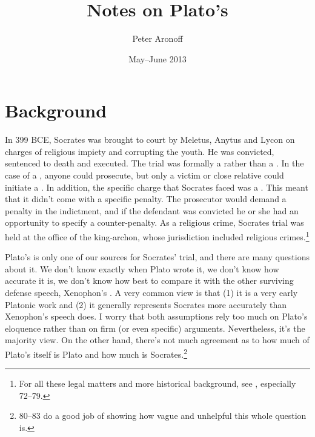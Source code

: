 \documentclass[11pt]{article}
\begin{document}
\begin{titlepage}
\title{Notes on Plato's }
\author{Peter Aronoff}
\date{May--June 2013}
\maketitle
\end{titlepage}

\section{Background}

In 399 BCE, Socrates was brought to court by Meletus, Anytus and Lycon on charges of religious impiety and corrupting the youth.  He was convicted, sentenced to death and executed.  The trial was formally a  rather than a .  In the case of a , anyone could prosecute, but only a victim or close relative could initiate a .  In addition, the specific charge that Socrates faced was a .  This meant that it didn't come with a specific penalty.  The prosecutor would demand a penalty in the indictment, and if the defendant was convicted he or she had an opportunity to specify a counter-penalty.  As a religious crime, Socrates trial was held at the office of the king-archon, whose jurisdiction included religious crimes.\footnote{For all these legal matters and more historical background, see \citet{brickhouse2004}, especially 72--79.}

Plato's  is only one of our sources for Socrates' trial, and there are many questions about it.  We don't know exactly when Plato wrote it, we don't know how accurate it is, we don't know how best to compare it with the other surviving defense speech, Xenophon's .  A very common view is that (1) it is a very early Platonic work and (2) it generally represents Socrates more accurately than Xenophon's speech does.  I worry that both assumptions rely too much on Plato's eloquence rather than on firm (or even specific) arguments.  Nevertheless, it's the majority view.  On the other hand, there's not much agreement as to how much of Plato's  itself is Plato and how much is Socrates.\footnote{ \citet{brickhouse2004} 80--83 do a good job of showing how vague and unhelpful this whole question is.}

\end{document}

